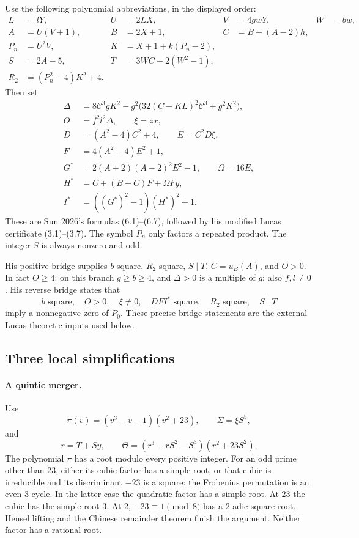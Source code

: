 Use the following polynomial abbreviations, in the displayed order:
\begin{align*}
 L&=lY,& U&=2LX,& V&=4gwY,& W&=bw,\\
 A&=U(V+1),& B&=2X+1,& C&=B+(A-2)h,\\
 P_n&=U^2V,& K&=X+1+k(P_n-2),\\
 S&=2A-5,&T&=3WC-2(W^2-1),\\
 R_2&=(P_n^2-4)K^2+4.&&
\end{align*}
Then set
\begin{align*}
 \Delta&=8\mathscr C^3gK^2
 -g^2\bigl(32(C-KL)^2\mathscr C^3+g^2K^2\bigr),\\
 O&=f^2l^2\Delta,\qquad \xi=zx,\\
 D&=(A^2-4)C^2+4,\qquad E=C^2D\xi,\\
 F&=4(A^2-4)E^2+1,\\
 G^*&=2(A+2)(A-2)^2E^2-1,\qquad \Omega=16E,\\
 H^*&=C+(B-C)F+\Omega Fy,\\
 I^*&=((G^*)^2-1)(H^*)^2+1.
\end{align*}
These are Sun 2026's formulas (6.1)--(6.7), followed by his modified Lucas
certificate (3.1)--(3.7).  The symbol $P_n$ only factors a repeated product.
The integer $S$ is always nonzero and odd.

His positive bridge supplies $b$ square, $R_2$ square, $S\mid T$,
$C=u_B(A)$, and $O>0$.  In fact $O\ge4$: on this branch $g\ge b\ge4$,
and $\Delta>0$ is a multiple of $g$; also $f,l\ne0$.
His reverse bridge states that
\[
 b\text{ square},\quad O>0,\quad\xi\ne0,\quad
 DFI^*\text{ square},\quad R_2\text{ square},\quad S\mid T
\]
imply a nonnegative zero of $P_0$.  These precise bridge statements are
the external Lucas-theoretic inputs used below.

\subsection{Three local simplifications}

\paragraph{A quintic merger.}
Use
\[
 \pi(v)=(v^3-v-1)(v^2+23),\qquad
 \Sigma=\xi S^5,
\]
and
\[
 r=T+Sy,\qquad
 \Theta=(r^3-rS^2-S^3)(r^2+23S^2).
\]
The polynomial $\pi$ has a root modulo every positive integer.  For an
odd prime other than 23, either its cubic factor has a simple root, or
that cubic is irreducible and its discriminant $-23$ is a square: the
Frobenius permutation is an even 3-cycle.  In the latter case the quadratic
factor has a simple root.  At 23 the cubic has the simple root 3.  At 2,
$-23\equiv1\pmod8$ has a 2-adic square root.  Hensel lifting and the Chinese
remainder theorem finish the argument.  Neither factor has a rational root.

